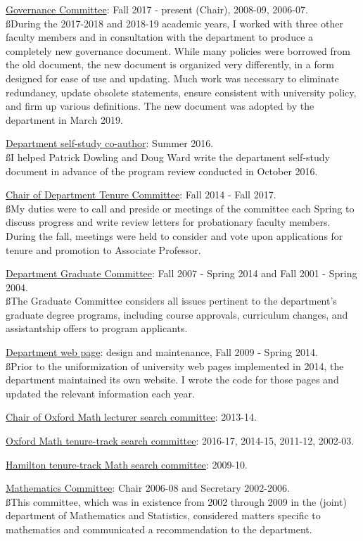 \documentclass[overlapped,line,letterpaper]{res}
\begin{document}
\begin{resume}
\underline{Governance Committee}: Fall 2017 - present (Chair), 2008-09, 2006-07. \\
{\ss During the 2017-2018 and 2018-19 academic years, I worked with three other faculty members and in consultation with the department to produce a completely new governance document.  While many policies were borrowed from the old document, the new document is organized very differently, in a form designed for ease of use and updating.  Much work was necessary to eliminate redundancy, update obsolete statements, ensure consistent with university policy, and firm up various definitions.  The new document was adopted by the department in March 2019.}

\underline{Department self-study co-author}: Summer 2016. \\
{\ss I helped Patrick Dowling and Doug Ward write the department self-study document in advance of the program review conducted in October 2016.}

\underline{Chair of Department Tenure Committee}: Fall 2014 - Fall 2017.\\
{\ss My duties were to call and preside or meetings of the committee each Spring to discuss progress and write review letters for probationary faculty members.  During the fall, meetings were held to consider and vote upon applications for tenure and promotion to Associate Professor.}

\underline{Department Graduate Committee}: Fall 2007 - Spring 2014 and Fall 2001 - Spring 2004.\\
{\ss The Graduate Committee considers all issues pertinent to the department's graduate degree programs, including course approvals, curriculum changes, and assistantship offers to program applicants.}

\underline {Department web page}: design and maintenance, Fall 2009 - Spring 2014.\\
{\ss Prior to the uniformization of university web pages implemented in 2014, the department maintained its own website.  I wrote the code for those pages and updated the relevant information each year.}

\underline{Chair of Oxford Math lecturer search committee}: 2013-14.

\underline{Oxford Math tenure-track search committee}: 2016-17, 2014-15, 2011-12, 2002-03.

\underline{Hamilton tenure-track Math search committee}: 2009-10.

\underline{Mathematics Committee}: Chair 2006-08 and Secretary 2002-2006.\\
{\ss This committee, which was in existence from 2002 through 2009 in the (joint) department of Mathematics and Statistics, considered matters specific to mathematics and communicated a recommendation to the department.}


\end{resume}
\end{document}
